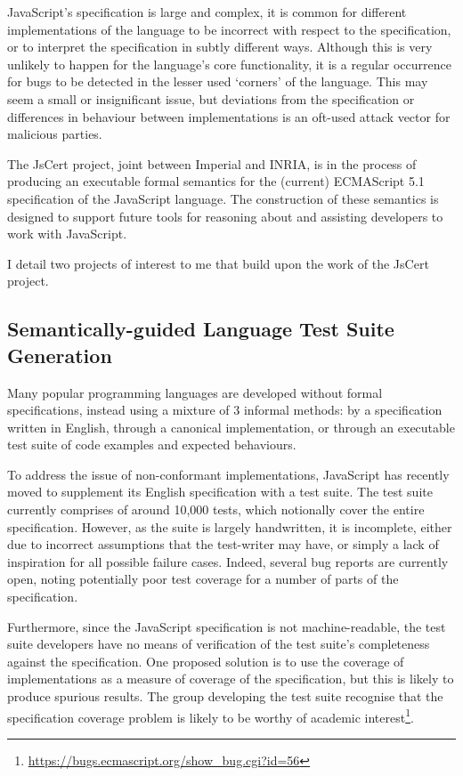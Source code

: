 \documentclass[a4paper]{article}
\begin{document}
JavaScript's specification is large and complex, it is common for
different implementations of the language to be incorrect with respect to the
specification, or to interpret the specification in subtly different ways.
Although this is very unlikely to happen for the language's core functionality,
it is a regular occurrence for bugs to be detected in the lesser used `corners'
of the language. This may seem a small or insignificant issue, but
deviations from the specification or differences in behaviour between
implementations is an oft-used attack vector for malicious parties.

The JsCert project, joint between Imperial and INRIA, is in the process of
producing an executable formal semantics for the (current) ECMAScript 5.1
specification of the JavaScript language.
The construction of these semantics is designed to support future tools for
reasoning about and assisting developers to work with JavaScript.

I detail two projects of interest to me that build upon
the work of the JsCert project.

\subsection{Semantically-guided Language Test Suite Generation}
Many popular programming languages are developed without formal specifications,
instead using a mixture of 3 informal methods: by a specification written in English,
through a canonical implementation, or through an executable test suite of code
examples and expected behaviours.

To address the issue of non-conformant implementations, JavaScript has recently
moved to supplement its English specification with a test suite. The test suite
currently comprises of around 10,000 tests, which notionally cover the entire
specification. However, as the suite is largely handwritten, it is incomplete,
either due to incorrect assumptions that the test-writer may have, or simply a
lack of inspiration for all possible failure
cases. Indeed, several bug reports are currently open, noting potentially
poor test coverage for a number of parts of the specification.

Furthermore, since the JavaScript specification is not machine-readable, the
test suite developers have no means of verification of the test suite's
completeness against the specification. One proposed solution is to use the
coverage of implementations as a measure of coverage of the specification, but
this is likely to produce spurious results. The group developing the test suite
recognise that the specification coverage problem is likely to be worthy of
academic interest\footnote{\url{https://bugs.ecmascript.org/show_bug.cgi?id=56}}.
\end{document}
